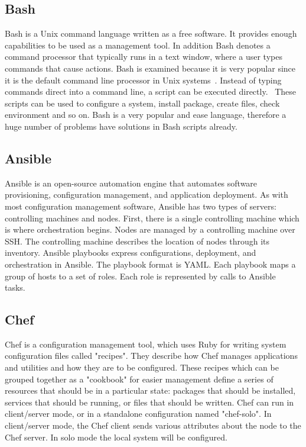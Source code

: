 \subsection*{Bash} \label{lang:bash}
Bash is a Unix command language written as a free software.
It provides enough capabilities to be used as a  management tool.
In addition Bash denotes a command processor that typically runs in a text window, where a user types commands that cause actions.
Bash is examined because it is very popular since it is the default command line processor in Unix systems~\cite*{bashdef}.
Instead of typing commands direct into a command line, a script can be executed directly.~\cite{bash}
These scripts can be used to configure a system, install package, create files, check environment and so on.
Bash is a very popular and ease language, therefore a huge number of problems have solutions in Bash scripts already.
\subsection*{Ansible} \label{lang:ansible}
Ansible is an open-source automation engine that automates software provisioning, configuration management, and application deployment.
As with most configuration management software, Ansible has two types of servers: controlling machines and nodes.
First, there is a single controlling machine which is where orchestration begins.
Nodes are managed by a controlling machine over SSH.
The controlling machine describes the location of nodes through its inventory.
Ansible playbooks express configurations, deployment, and orchestration in Ansible.
The playbook format is YAML. 
Each playbook maps a group of hosts to a set of roles.
Each role is represented by calls to Ansible tasks.~\cite{ansible} 
\subsection*{Chef} \label{lang:shef}
Chef is a configuration management tool, which uses Ruby for writing system configuration files called "recipes".
They describe how Chef manages applications and utilities and how they are to be configured.
These recipes which can be grouped together as a "cookbook" for easier management define a series of resources that should be in a particular state: packages that should be installed, services that should be running, or files that should be written.
Chef can run in client/server mode, or in a standalone configuration named "chef-solo".
In client/server mode, the Chef client sends various attributes about the node to the Chef server. 
In solo mode the local system will be configured.~\cite{chef}
